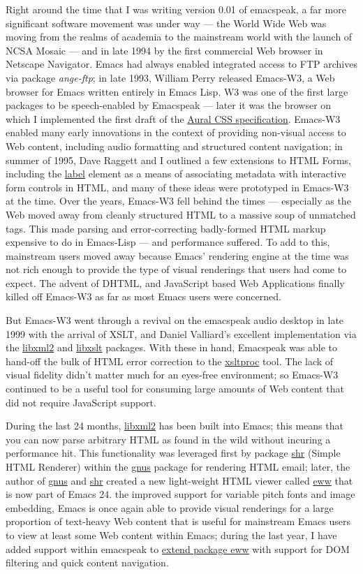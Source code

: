 \documentclass[11pt]{article}
\begin{document}
Right around the time that I was writing version 0.01 of
emacspeak, a far more significant software movement was under way
  —   the World Wide Web was moving from the realms of academia to
the mainstream world with the launch of NCSA Mosaic   — 
  and in
late 1994 by the first commercial Web browser in Netscape
Navigator. Emacs had always enabled integrated access to FTP
archives via package \emph{ange-ftp}; in late 1993, William Perry
released Emacs-W3, a Web browser for Emacs written entirely in
Emacs Lisp. W3 was one of the first large packages to be
speech-enabled by Emacspeak   —   later it was the browser on which
I implemented the first draft of the \href{http://www.w3.org/TR/CSS2/aural.html}{Aural CSS
specification}. Emacs-W3 enabled many early innovations in the
context of providing non-visual access to Web content, including
audio formatting and structured content navigation; in summer of
1995, Dave Raggett and I outlined a few extensions to HTML Forms,
including the \uline{label} element as a means of associating metadata
with interactive form controls in HTML, and many of these ideas
were prototyped in Emacs-W3 at the time. Over the years, Emacs-W3 fell
behind the times   —   especially as the Web moved away from
cleanly structured HTML to a massive soup of unmatched tags. This
made parsing and error-correcting badly-formed HTML markup
expensive to do in Emacs-Lisp  —  
and performance suffered. To add
to this, mainstream users moved away because Emacs' rendering
engine at the time was not rich enough to provide the type of
visual renderings that users had come to expect. The advent of
DHTML, and JavaScript based Web Applications finally killed off
Emacs-W3 as far as most Emacs users were concerned.

But Emacs-W3 went through a revival on the emacspeak audio
desktop in late 1999 with the arrival of XSLT, and Daniel
Valliard's excellent implementation via the \uline{libxml2} and
\uline{libxslt} packages. With these in hand, Emacspeak was able to
hand-off the bulk of HTML error correction to the \uline{xsltproc}
tool. The lack of visual fidelity didn't matter much for an
eyes-free environment; so Emacs-W3 continued to be a useful tool
for consuming large amounts of Web content that did not require
JavaScript support.

During the last 24 months, \uline{libxml2} has been built into Emacs;
this means that you can now parse arbitrary HTML as found in the
wild without incuring a performance hit. This functionality was
leveraged first by package \uline{shr} (Simple HTML Renderer) within
the \uline{gnus} package for rendering HTML email; later, the author of
\uline{gnus} and \uline{shr} created a new light-weight HTML viewer called
\uline{eww} that is now part of Emacs 24. the improved support for
variable pitch fonts and image embedding, Emacs is once again
able to provide visual renderings for a large proportion of
text-heavy Web content that is useful for mainstream Emacs users
to view at least some Web content within Emacs; during the last
year, I have added support within emacspeak to \href{http://emacspeak.blogspot.com/2014/05/emacspeak-eww-updates-for-complete.html}{extend package
\uline{eww}} with support for DOM filtering and quick content
navigation.
\end{document}
